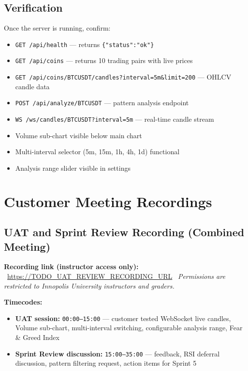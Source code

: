 \documentclass[11pt,a4paper]{article}
\begin{document}
\subsection{Verification}
Once the server is running, confirm:
\begin{itemize}
    \item \texttt{GET /api/health} --- returns \texttt{\{"status":"ok"\}}
    \item \texttt{GET /api/coins} --- returns 10 trading pairs with live prices
    \item \texttt{GET /api/coins/BTCUSDT/candles?interval=5m\&limit=200} --- OHLCV candle data
    \item \texttt{POST /api/analyze/BTCUSDT} --- pattern analysis endpoint
    \item \texttt{WS /ws/candles/BTCUSDT?interval=5m} --- real-time candle stream
    \item Volume sub-chart visible below main chart
    \item Multi-interval selector (5m, 15m, 1h, 4h, 1d) functional
    \item Analysis range slider visible in settings
\end{itemize}

\section{Customer Meeting Recordings}

\subsection{UAT and Sprint Review Recording (Combined Meeting)}
\textbf{Recording link (instructor access only):} \
\url{https://TODO_UAT_REVIEW_RECORDING_URL} \
\textit{Permissions are restricted to Innopolis University instructors and graders.}

\textbf{Timecodes:}
\begin{itemize}
    \item \textbf{UAT session:} \texttt{00:00--15:00} --- customer tested WebSocket live candles, Volume sub-chart, multi-interval switching, configurable analysis range, Fear \& Greed Index
    \item \textbf{Sprint Review discussion:} \texttt{15:00--35:00} --- feedback, RSI deferral discussion, pattern filtering request, action items for Sprint 5
\end{itemize}
\end{document}
